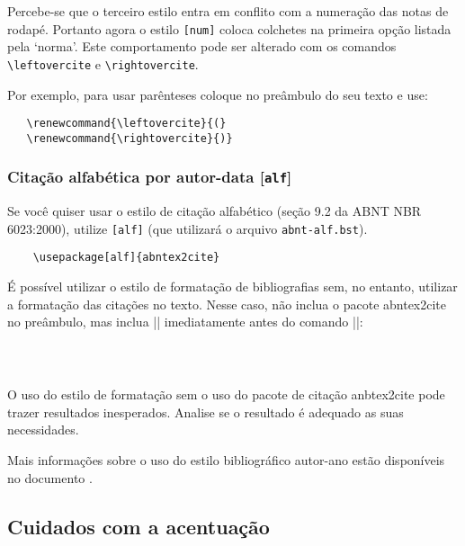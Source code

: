 \documentclass[a4paper]{ltxdoc}
\begin{document}
\DescribeMacro{\leftovercite}\DescribeMacro{\rightovercite}
Percebe-se que o terceiro estilo entra em conflito com a numeração das notas de
rodapé. Portanto agora o estilo {\tt [num]} coloca colchetes na primeira opção
listada pela `norma'\cite{NBR6023:2000}. Este comportamento pode ser alterado
com os comandos \verb+\leftovercite+ e \verb+\rightovercite+.

Por exemplo, para usar parênteses coloque no preâmbulo do seu texto e use:

\begin{verbatim}
   \renewcommand{\leftovercite}{(}
   \renewcommand{\rightovercite}{)}
\end{verbatim}


\subsubsection{Citação alfabética por autor-data [{\tt alf}]}

\DescribeMacro{\usepackage[alf]{abntex2cite}}
Se você quiser usar o estilo de citação alfabético
(seção 9.2 da ABNT NBR 6023:2000\cite{NBR6023:2000}),
utilize {\tt [alf]} (que utilizará o arquivo {\tt abnt-alf.bst}).

\begin{verbatim}
    \usepackage[alf]{abntex2cite}
\end{verbatim}

É possível utilizar o estilo de formatação de bibliografias sem, no entanto,
utilizar a formatação das citações no texto. Nesse caso, não inclua o pacote
\textsf{abntex2cite} no preâmbulo, mas inclua ||
imediatamente antes do comando
||:

\begin{verbatim}
    
    
\end{verbatim}

O uso do estilo de formatação sem o uso do pacote de citação
\textsf{anbtex2cite} pode trazer resultados inesperados. Analise se o resultado
é adequado as suas necessidades.

Mais informações sobre o uso do estilo bibliográfico autor-ano estão disponíveis
no documento .

\subsection{Cuidados com a acentuação}
\end{document}
